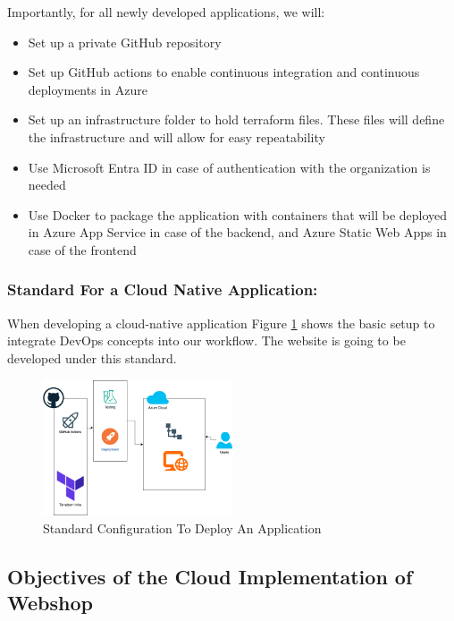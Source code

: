\documentclass{llncs}
\begin{document}
Importantly, for all newly developed applications, we will:
\begin{itemize}
    \item Set up a private GitHub repository
    \item Set up GitHub actions to enable continuous integration and continuous deployments in Azure
    \item Set up an infrastructure folder to hold terraform files. These files will define the infrastructure and will allow for easy repeatability
    \item Use Microsoft Entra ID in case of authentication with the organization is needed
    \item Use Docker to package the application with containers that will be deployed in Azure App Service in case of the backend, and Azure Static Web Apps in case of the frontend
\end{itemize}

\subsubsection*{Standard For a Cloud Native Application:}
When developing a cloud-native application Figure \ref{CloudStandard} shows the basic setup to integrate DevOps concepts into our workflow.
The website is going to be developed under this standard.\\

\begin{figure}[htbp]
    \begin{center}
        \includegraphics[width=0.5\textwidth]{../diagrams/AppStandard.drawio.png}
        \vspace{0.01\textwidth}
        \caption{Standard Configuration To Deploy An Application}
        \label{CloudStandard} %
    \end{center}
\end{figure}


\subsection{Objectives of the Cloud Implementation of Webshop}
\end{document}

